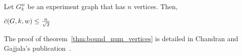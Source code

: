 \begin{theorem}
    \label{thm:bound_num_vertices}
    Let $G_k^w$ be an experiment graph that has $n$ vertices.
    Then,
    \begin{center}
        $\Tilde{c}(G, k, w) \leq \frac{n}{\sqrt{2}}$
    \end{center}
\end{theorem}

The proof of theorem~\ref{thm:bound_num_vertices} is detailed in Chandran and Gajjala's publication~\cite{chandran2023graphtheoretic}.
